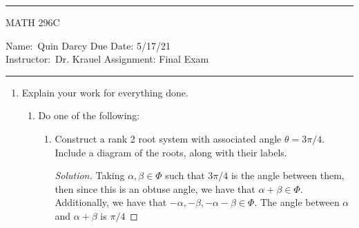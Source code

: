 \documentclass[12pt]{article}
\theoremstyle{definition}
\newenvironment{solution}
{\renewcommand\qedsymbol{$\blacksquare$}\begin{proof}[Solution]}
{\end{proof}}
\begin{document}
    \thispagestyle{empty}\hrule

    \begin{center}
        \vspace{.4cm} { \large MATH 296C}
    \end{center}
    {Name:\ Quin Darcy \hspace{\fill} Due Date: 5/17/21   \\
    { Instructor:}\ Dr. Krauel \hspace{\fill} Assignment:
    Final Exam \\ \hrule}

    \begin{enumerate}
        \item Explain your work for everything done.
        \begin{enumerate}[label=\textbf{\alph*}.]
            \item Do one of the following:
            \begin{enumerate}[label=(\Roman*)]
                \item Construct a rank 2 root system with associated angle $\theta=3\pi/4$. Include a diagram of the roots, along with their labels.
                \begin{solution}
                    Taking $\alpha,\beta\in\Phi$ such that $3\pi/4$ is the angle between them, then since this is an obtuse angle, we have that $\alpha+\beta\in\Phi$. Additionally, we have that $-\alpha, -\beta, -\alpha-\beta\in\Phi$. The angle between $\alpha$ and $\alpha+\beta$ is $\pi/4$
                \end{solution}
            \end{enumerate}
        \end{enumerate}
    \end{enumerate}
\end{document}
